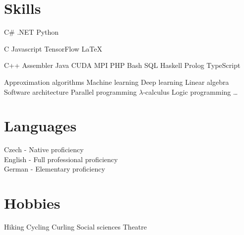 \documentclass[a4paper]{deedy-resume} %
\begin{document}
\begin{minipage}[t]{0.33\textwidth}
\sectionspace %


\section{Skills}


C\# \textbullet{} .NET \textbullet{}  Python \\ 
\halfsectionspace %

C \textbullet{} Javascript \textbullet{} TensorFlow \textbullet{} \LaTeX\   \\
\halfsectionspace %

C++ \textbullet{} Assembler \textbullet{} Java \textbullet{} CUDA \textbullet{} MPI \textbullet{} PHP \textbullet{} Bash \textbullet{} SQL \textbullet{} Haskell \textbullet{} Prolog \textbullet TypeScript \\

\sectionspace %


Approximation algorithms \textbullet{} Machine learning \textbullet{} Deep learning \textbullet{} Linear algebra \textbullet{} Software architecture \textbullet{} Parallel programming \textbullet{} $\lambda$-calculus \textbullet{} Logic programming \textbullet{} \ldots 

\sectionspace %

\section{Languages}

Czech - Native proficiency \\
English - Full professional proficiency \\
German - Elementary proficiency

\sectionspace %

\section{Hobbies}

Hiking \textbullet{} Cycling \textbullet{} Curling \textbullet{} Social sciences \textbullet{} Theatre

\sectionspace %


\end{minipage} %
\end{document}

